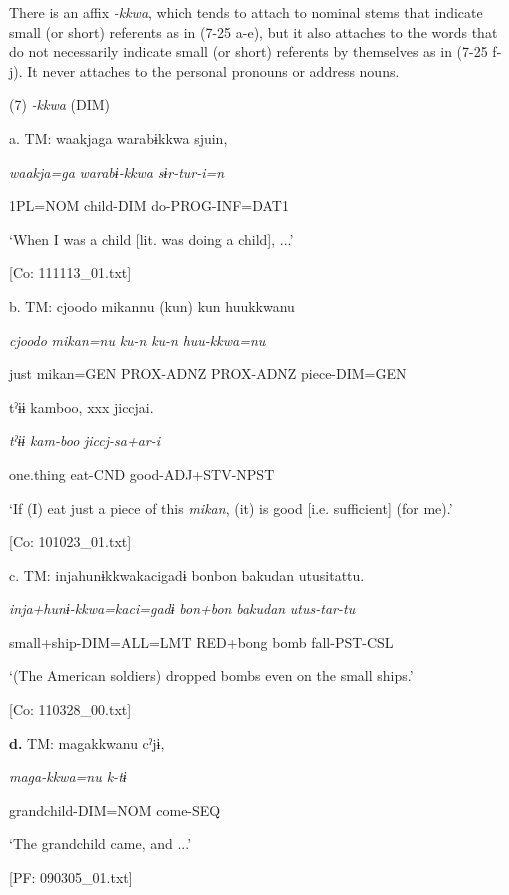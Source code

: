 There is an affix \textit{{}-kkwa}, which tends to attach to nominal stems that indicate small (or short) referents as in (7-25 a-e), but it also attaches to the words that do not necessarily indicate small (or short) referents by themselves as in (7-25 f-j). It never attaches to the personal pronouns or address nouns.

(7)  \textit{{}-kkwa} (DIM)

  a.  TM:  waakjaga  warabɨkkwa  sjuin,

      \textit{waakja=ga}  \textit{warabɨ-kkwa}  \textit{sɨr-tur-i=n}

      1PL=NOM  child-DIM  do-PROG-INF=DAT1

      ‘When I was a child [lit. was doing a child], ...’

      [Co: 111113\_01.txt]

  b.  TM:  {\textbar}cjoodo  mikan{\textbar}nu  (kun)  kun  huukkwanu

      \textit{cjoodo}  \textit{mikan=nu}  \textit{ku-n}  \textit{ku-n}  \textit{huu-kkwa=nu}

      just  mikan=GEN  PROX-ADNZ  PROX-ADNZ  piece-DIM=GEN

      tˀɨɨ  kamboo,  xxx  jiccjai.

      \textit{tˀɨɨ}  \textit{kam-boo}    \textit{jiccj-sa+ar-i}

      one.thing  eat-CND    good-ADJ+STV-NPST

      ‘If (I) eat just a piece of this \textit{mikan}, (it) is good [i.e. sufficient] (for me).’

      [Co: 101023\_01.txt]

  c.  TM:  injahunɨkkwakacigadɨ  {\textbar}bonbon  bakudan  utusi{\textbar}tattu.

      \textit{inja+hunɨ-kkwa=kaci=gadɨ}  \textit{bon+bon}  \textit{bakudan}  \textit{utus-tar-tu}

      small+ship-DIM=ALL=LMT  RED+bong  bomb  fall-PST-CSL

      ‘(The American soldiers) dropped bombs even on the small ships.’

      [Co: 110328\_00.txt]

  \textbf{d.}  TM:  magakkwanu  cˀjɨ,

      \textit{maga{}-kkwa=nu  k-tɨ}

      grandchild-DIM=NOM  come-SEQ

      ‘The grandchild came, and ...’

      [PF: 090305\_01.txt]

